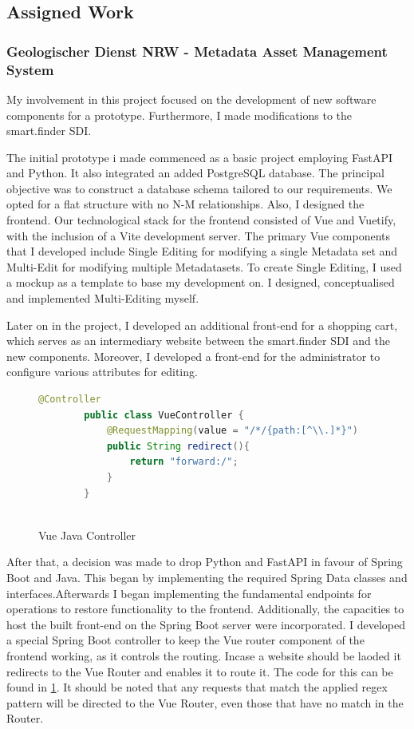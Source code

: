 \documentclass[11pt, titlepage, a4paper]{article}
\begin{document}
\subsection{Assigned Work}
\subsubsection{Geologischer Dienst NRW - Metadata Asset Management System}
My involvement in this project focused on the development of new software components for a prototype. Furthermore, I made modifications to the smart.finder SDI.


The initial prototype i made commenced as a basic project employing FastAPI and Python. It also integrated an added PostgreSQL database. The principal objective was to construct a database schema tailored to our requirements. We opted for a flat structure with no N-M relationships.
Also, I designed the frontend. Our technological stack for the frontend consisted of Vue and Vuetify, with the inclusion of a Vite development server. The primary Vue components that I developed include Single Editing for modifying a single Metadata set and Multi-Edit for modifying multiple Metadatasets. To create Single Editing, I used a mockup as a template to base my development on. I designed, conceptualised and implemented Multi-Editing myself.

Later on in the project, I developed an additional front-end for a shopping cart, which serves as an intermediary website between the smart.finder SDI and the new components. Moreover, I developed a front-end for the administrator to configure various attributes for editing.

\begin{figure}[t]
    \caption{Vue Java Controller}
    \label{fig:vue}
    \begin{lstlisting}[language=java, frame=single]
        @Controller
        public class VueController {
            @RequestMapping(value = "/*/{path:[^\\.]*}")
            public String redirect(){
                return "forward:/";
            }
        }
        
        \end{lstlisting}
    \centering
\end{figure}


After that, a decision was made to drop Python and FastAPI in favour of Spring Boot and Java. This began by implementing the required Spring Data classes and interfaces.Afterwards I began implementing the fundamental endpoints for  operations to restore functionality to the frontend. Additionally, the capacities to host the built front-end on the Spring Boot server were incorporated. I developed a special Spring Boot controller to keep the Vue router component of the frontend working, as it controls the routing. Incase a website should be laoded it redirects to the Vue Router and enables it to route it. The code for this can be found in \ref{fig:vue}. It should be noted that any requests that match the applied regex pattern will be directed to the Vue Router, even those that have no match in the Router.
\end{document}
